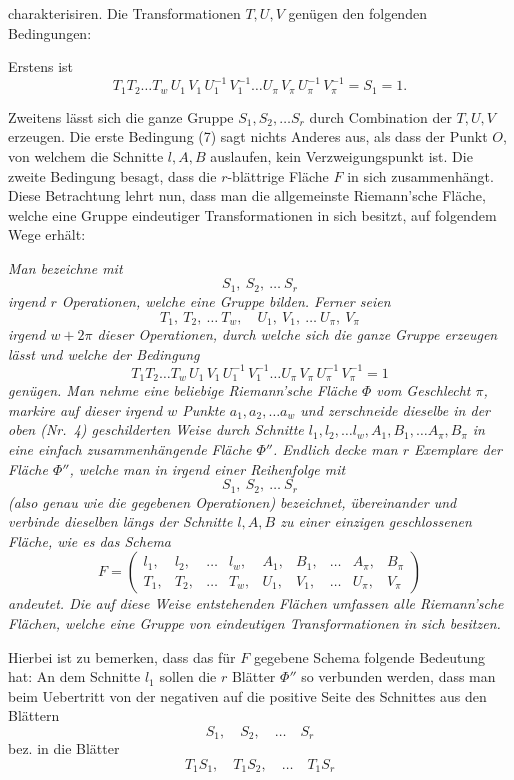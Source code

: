 \documentclass{article}
\begin{document}
charakterisiren. Die Transformationen $T, U, V$ genügen den folgenden Bedingungen:

Erstens ist
\[
T_1 T_2 \dots T_w \, U_1 \, V_1 \, U_1^{-1} \, V_1^{-1} \dots U_\pi \, V_\pi \, U_\pi^{-1} \, V_\pi^{-1} = S_1 = 1.
\tag{7}
\]

Zweitens lässt sich die ganze Gruppe $S_1, S_2, \dots S_r$ durch Combination der $T, U, V$ erzeugen. Die erste Bedingung (7) sagt nichts Anderes aus, als dass der Punkt $O$, von welchem die Schnitte $l, A, B$ auslaufen, kein Verzweigungspunkt ist. Die zweite Bedingung besagt, dass die $r$-blättrige Fläche $F$ in sich zusammenhängt. Diese Betrachtung lehrt nun, dass man die allgemeinste Riemann'sche Fläche, welche eine Gruppe eindeutiger Transformationen in sich besitzt, auf folgendem Wege erhält:

\emph{Man bezeichne mit}
\[
S_1, \ S_2, \ \dots \ S_r
\]
\emph{irgend $r$ Operationen, welche eine Gruppe bilden. Ferner seien}
\[
T_1, \ T_2, \ \dots \ T_w, \quad U_1, \ V_1, \ \dots \ U_\pi, \ V_\pi
\]
\emph{irgend $w + 2\pi$ dieser Operationen, durch welche sich die ganze Gruppe erzeugen lässt und welche der Bedingung}
\[
T_1 T_2 \dots T_w \, U_1 \, V_1 \, U_1^{-1} \, V_1^{-1} \dots U_\pi \, V_\pi \, U_\pi^{-1} \, V_\pi^{-1} = 1
\]
\emph{genügen. Man nehme eine beliebige Riemann'sche Fläche $\Phi$ vom Geschlecht $\pi$, markire auf dieser irgend $w$ Punkte $a_1, a_2, \dots a_w$ und zerschneide dieselbe in der oben (Nr.~4) geschilderten Weise durch Schnitte $l_1, l_2, \dots l_w, A_1, B_1, \dots A_\pi, B_\pi$ in eine einfach zusammenhängende Fläche $\Phi''$. Endlich decke man $r$ Exemplare der Fläche $\Phi''$, welche man in irgend einer Reihenfolge mit}
\[
S_1, \ S_2, \ \dots \ S_r
\]
\emph{(also genau wie die gegebenen Operationen) bezeichnet, übereinander und verbinde dieselben längs der Schnitte $l, A, B$ zu einer einzigen geschlossenen Fläche, wie es das Schema}
\[
F = \begin{pmatrix}
l_1, & l_2, & \dots & l_w, & A_1, & B_1, & \dots & A_\pi, & B_\pi \\
T_1, & T_2, & \dots & T_w, & U_1, & V_1, & \dots & U_\pi, & V_\pi
\end{pmatrix}
\]
\emph{andeutet. Die auf diese Weise entstehenden Flächen umfassen alle Riemann'sche Flächen, welche eine Gruppe von eindeutigen Transformationen in sich besitzen.}

Hierbei ist zu bemerken, dass das für $F$ gegebene Schema folgende Bedeutung hat: An dem Schnitte $l_1$ sollen die $r$ Blätter $\Phi''$ so verbunden werden, dass man beim Uebertritt von der negativen auf die positive Seite des Schnittes aus den Blättern
\[
S_1, \quad S_2, \quad \dots \quad S_r
\]
bez. in die Blätter
\[
T_1 S_1, \quad T_1 S_2, \quad \dots \quad T_1 S_r
\]
\end{document}
